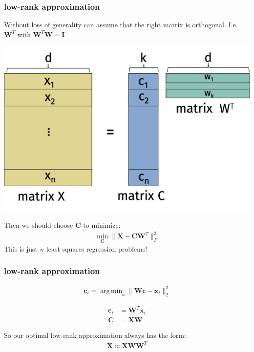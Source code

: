 \documentclass[compress]{beamer}
\newcommand{\bv}[1]{\mathbf{#1}}
\DeclareMathOperator*{\argmin}{arg\,min}
\begin{document}
\begin{frame}
	\frametitle{low-rank approximation}
	Without loss of generality can assume that the right matrix is orthogonal. I.e. $\bv{W}^T$ with $\bv{W}^T\bv{W} = \bv{I}$
	\vspace{-1em}
	\begin{center}
		\includegraphics[width=.6\textwidth]{low-rank-orth.png}
	\end{center}
Then we should choose $\bv{C}$ to minimize:
\begin{align*}
	\min_{\bv{C}} \|\bv{X} - \bv{C}\bv{W}^T\|_F^2
\end{align*}
This is just $n$ least squares regression problems!
\end{frame}

\begin{frame}
	\frametitle{low-rank approximation}
	\begin{align*}
		\bv{c}_i = \argmin_{\bv{c}} \|\bv{W} \bv{c} - \bv{x}_i\|_2^2
	\end{align*}
\vspace{3em}

\begin{align*}
	\bv{c}_i  &= \bv{W}^T\bv{x}_i \\
	\bv{C} &= \bv{X}\bv{W}
\end{align*}

So our optimal low-rank approximation always has the form:
\begin{align*}
	\bv{X} \approx \bv{X}\bv{W}\bv{W}^T
\end{align*}
\end{frame}
\end{document}
